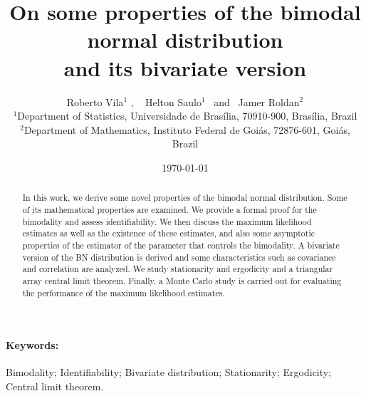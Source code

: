 \documentclass[12pt]{article}
\theoremstyle{definition}
\begin{document}
	
%
\title{\bf On some properties of the bimodal normal distribution \\
	and its bivariate version}

\date{\today}
%
%

\author{
%
{ Roberto Vila$^1$ }, \
{ Helton Saulo$^1$ } \ and \
{Jamer Roldan$^2$ }
\\[0.15cm]
{\normalsize
$^1$Department of Statistics, Universidade de Brasília, 70910-900, Brasília, Brazil}
\\
{\normalsize
$^2$Department of Mathematics, Instituto Federal de Goiás, 72876-601, Goiás, Brazil}
} 
%

\maketitle %
%
\begin{abstract}
In this work, we derive some novel properties of the bimodal normal distribution. Some of its mathematical properties are examined. We provide a formal proof for the bimodality and assess identifiability. We then discuss the maximum likelihood estimates as well as the existence of these estimates, and also some asymptotic properties of the estimator of the parameter that controls the bimodality. A bivariate version of the BN distribution is derived and some characteristics such as covariance and correlation are analyzed. We study stationarity and ergodicity and a triangular array central limit theorem. Finally, a Monte Carlo study is carried out for evaluating the performance of the maximum likelihood estimates.


\end{abstract}

\paragraph{Keywords:}Bimodality; Identifiability; Bivariate distribution; Stationarity; Ergodicity; Central limit theorem.




\maketitle
\end{document}
